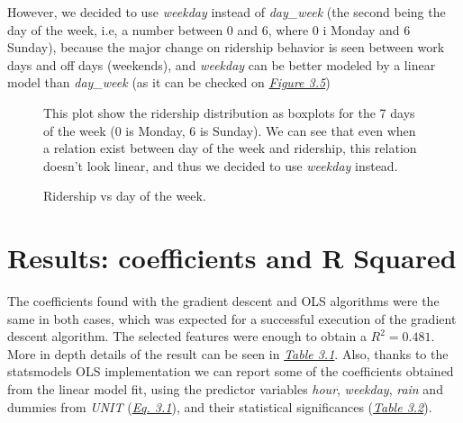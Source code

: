 \documentclass[letterpaper,10pt,english]{sphinxmanual}
\begin{document}
However, we decided to use \emph{weekday} instead of \emph{day\_week} (the second being the
day of the week, i.e, a number between 0 and 6, where 0 i Monday and 6 Sunday),
because the major change on ridership behavior is seen between work days and
off days (weekends), and \emph{weekday} can be better modeled by a linear model than
\emph{day\_week} (as it can be checked on {\hyperref[section2:figure35]{\emph{Figure 3.5}}})
\begin{figure}[htbp]
\centering
\capstart

\caption{Ridership vs day of the week.}{\small 
This plot show the ridership distribution as boxplots for the 7 days of the
week (0 is Monday, 6 is Sunday). We can see that even when a relation
exist between day of the week and ridership, this relation doesn't look
linear, and thus we decided to use \emph{weekday} instead.
}\label{section2:figure35}\end{figure}


\section{Results: coefficients and R Squared}
\label{section2:results-coefficients-and-r-squared}
The coefficients found with the gradient descent and OLS algorithms were the
same in both cases, which was expected for a successful execution of the
gradient descent algorithm. The selected features were enough to obtain a
\(R^2 = 0.481\). More in depth details of the result can be seen in
{\hyperref[section2:table31]{\emph{Table 3.1}}}. Also, thanks to the statsmodels OLS implementation
we can report some of the coefficients obtained from the linear model fit,
using the predictor variables \emph{hour}, \emph{weekday}, \emph{rain} and dummies from \emph{UNIT}
({\hyperref[section2:multreg-mod]{\emph{Eq. 3.1}}}), and their statistical significances
({\hyperref[section2:table32]{\emph{Table 3.2}}}).
\end{document}
